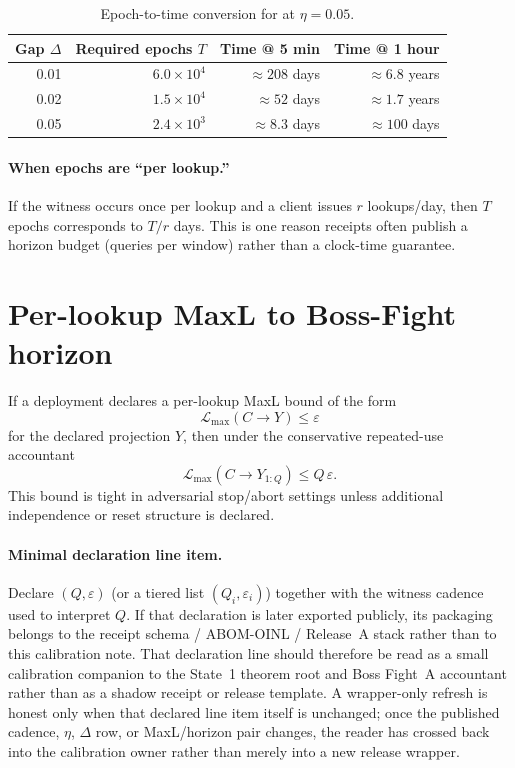 \documentclass[11pt]{article}
\theoremstyle{definition}
\theoremstyle{remark}
\begin{document}
\begin{table}[t]
\centering
\begin{tabular}{@{}r r r r@{}}
\toprule
Gap $\Delta$ & Required epochs $T$ & Time @ 5 min & Time @ 1 hour \\
\midrule
0.01 & $6.0\times 10^{4}$ & $\approx 208$ days & $\approx 6.8$ years \\
0.02 & $1.5\times 10^{4}$ & $\approx 52$ days & $\approx 1.7$ years \\
0.05 & $2.4\times 10^{3}$ & $\approx 8.3$ days & $\approx 100$ days \\
\bottomrule
\end{tabular}
\caption{Epoch-to-time conversion for  at $\eta=0.05$.}
\label{tab:vignette-times}
\end{table}

\paragraph{When epochs are ``per lookup.''}
If the witness occurs once per lookup and a client issues $r$ lookups/day, then $T$ epochs corresponds to $T/r$ days.
This is one reason receipts often publish a horizon budget (queries per window) rather than a clock-time guarantee.

\section{Per-lookup MaxL to Boss-Fight horizon}

If a deployment declares a per-lookup MaxL bound of the form
\[
\mathcal{L}_{\max}(C\!\to\! Y)\le \varepsilon
\]
for the declared projection $Y$, then under the conservative repeated-use accountant
\[
\mathcal{L}_{\max}(C\!\to\! Y_{1:Q}) \le Q\,\varepsilon.
\]
This bound is tight in adversarial stop/abort settings unless additional independence or reset structure is declared.\cite{series:bossfightA}

\paragraph{Minimal declaration line item.}
Declare $(Q,\varepsilon)$ (or a tiered list $(Q_i,\varepsilon_i)$) together with the witness cadence used to interpret $Q$.
If that declaration is later exported publicly, its packaging belongs to the receipt schema / ABOM-OINL / Release~A stack rather than to this calibration note.\cite{series:receiptitems,series:abomoinl,series:releaseproperty}
That declaration line should therefore be read as a small calibration companion to the State~1 theorem root and Boss Fight~A accountant rather than as a shadow receipt or release template.
A wrapper-only refresh is honest only when that declared line item itself is unchanged; once the published cadence, $\eta$, $\Delta$ row, or MaxL/horizon pair changes, the reader has crossed back into the calibration owner rather than merely into a new release wrapper.
\end{document}
